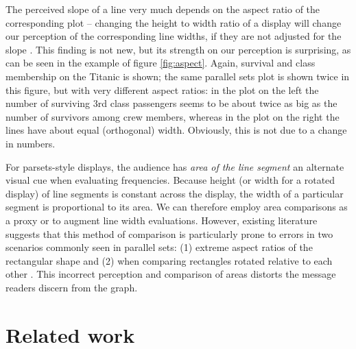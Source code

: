 The perceived slope of a line very much depends on the aspect ratio of the corresponding plot -- changing the height to width ratio of a display  will change our perception of the corresponding line widths, if they are not adjusted for the slope \cite{cleveland:1984}. This finding is not new, but its strength on our perception is surprising, as can be seen in the example of  figure \ref{fig:aspect}.  Again, survival and class membership on the Titanic is shown; the same parallel sets plot is shown twice in this figure, but with very different aspect ratios: in the  plot on the left the number of surviving 3rd class passengers seems to be about twice as big as the number of survivors among crew members, whereas in the plot on the right the lines have about equal (orthogonal) width. Obviously, this is not due to a change in numbers.

For parsets-style displays, the audience has {\it area of the line segment} an alternate visual cue when evaluating frequencies. Because height (or width for a rotated display) of  line segments is constant across the display, the width of a particular  segment is proportional to its area. We can therefore employ area comparisons as a proxy or to augment line width evaluations. 
However, existing literature suggests that this method of comparison is particularly  prone to errors in two scenarios commonly seen in parallel sets: (1) extreme aspect ratios of the rectangular shape \cite{heer:2010} %
and (2) when comparing rectangles rotated relative to each other \cite{kong:2010}. 
This incorrect perception and comparison of areas distorts the message readers discern from the graph. %


\section{Related work}

